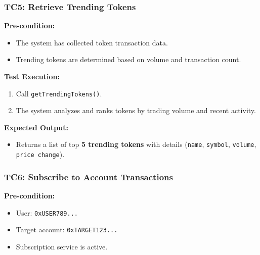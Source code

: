 \documentclass[
]{article}
\providecommand{\tightlist}{%
  \setlength{\itemsep}{0pt}\setlength{\parskip}{0pt}}
\begin{document}
\hypertarget{tc5-retrieve-trending-tokens}{%
\subsubsection{\texorpdfstring{\textbf{TC5: Retrieve Trending
Tokens}}{TC5: Retrieve Trending Tokens}}\label{tc5-retrieve-trending-tokens}}

\textbf{Pre-condition:}

\begin{itemize}
\tightlist
\item
  The system has collected token transaction data.
\item
  Trending tokens are determined based on volume and transaction count.
\end{itemize}

\textbf{Test Execution:}

\begin{enumerate}
\def\labelenumi{\arabic{enumi}.}
\tightlist
\item
  Call \texttt{getTrendingTokens()}.
\item
  The system analyzes and ranks tokens by trading volume and recent
  activity.
\end{enumerate}

\textbf{Expected Output:}

\begin{itemize}
\tightlist
\item
  Returns a list of top \textbf{5 trending tokens} with details
  (\texttt{name}, \texttt{symbol}, \texttt{volume},
  \texttt{price\ change}).
\end{itemize}

\hypertarget{tc6-subscribe-to-account-transactions}{%
\subsubsection{\texorpdfstring{\textbf{TC6: Subscribe to Account
Transactions}}{TC6: Subscribe to Account Transactions}}\label{tc6-subscribe-to-account-transactions}}

\textbf{Pre-condition:}

\begin{itemize}
\tightlist
\item
  User: \texttt{0xUSER789...}
\item
  Target account: \texttt{0xTARGET123...}
\item
  Subscription service is active.
\end{itemize}
\end{document}
